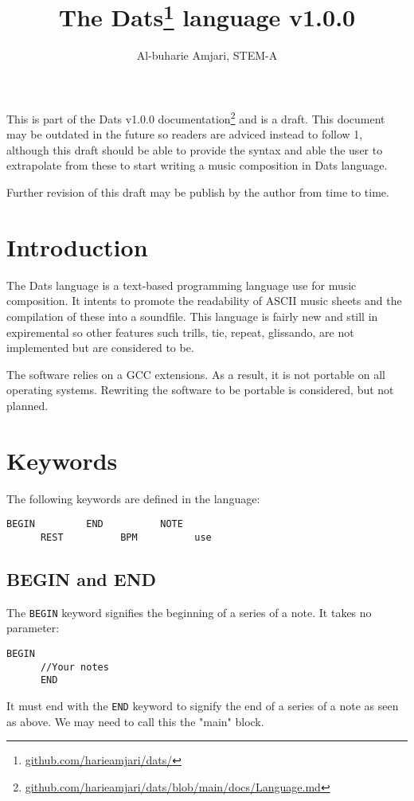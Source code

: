 \documentclass{article}
\title{\textbf{The Dats\thanks{\url{github.com/harieamjari/dats/}} language v1.0.0}}
\author{Al-buharie Amjari, STEM-A}
\begin{document}
\maketitle

\abstract
This is part of the Dats v1.0.0 documentation\footnote{\url{github.com/harieamjari/dats/blob/main/docs/Language.md}} and is a draft. This document may be outdated in the future so readers are adviced instead to follow 1, although this draft should be able to provide the syntax and able the user to extrapolate from these to
start writing a music composition in Dats language.

Further revision of this draft may be publish by the author from time to time.


\section{Introduction}

\indent The Dats language is a text-based programming language use for music composition.  It intents to promote the readability of ASCII music sheets and the compilation of these into a soundfile.
This language is fairly new and still in expiremental so other features such trills, tie,
repeat, glissando, are not implemented but are considered to be.

The software relies on a GCC extensions. As a result, it is not portable on all operating systems. Rewriting the software to be portable is considered, but not planned. 


\section{Keywords}

The following keywords are defined in the language:
\begin{Verbatim}[frame=single]
      BEGIN         END          NOTE 
      REST          BPM          use
\end{Verbatim}

\subsection{BEGIN and END}

The \verb+BEGIN+ keyword signifies the beginning of a series of a note. It
takes no parameter:
\begin{Verbatim}[frame=single]
      BEGIN
      //Your notes
      END
\end{Verbatim}
It must end with the \verb+END+ keyword to signify the end of a series
of a note as seen as above. We may need to call this the "main" block.
\end{document}
